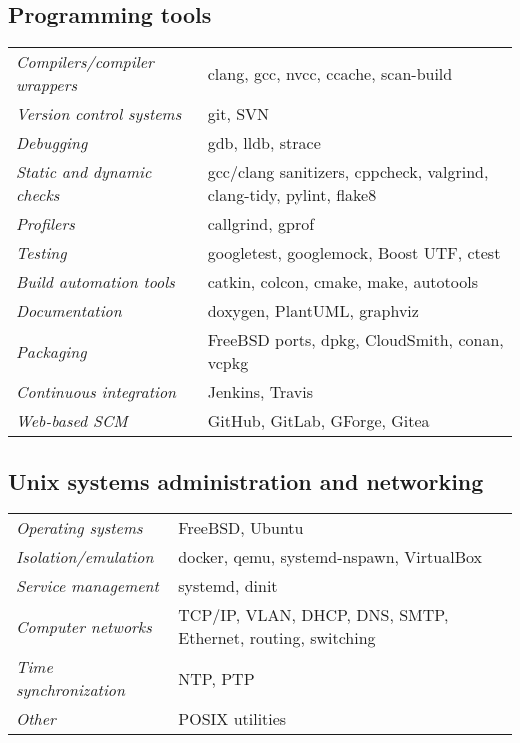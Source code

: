 \documentclass[a4paper,10pt]{report}
\begin{document}
\begin{adjustwidth}{0.5cm}{0pt}
\subsection{Programming tools}
\begin{adjustwidth}{0.5cm}{0pt}
    \begin{tabularx}{\linewidth}{l X}
        {\it Compilers/compiler wrappers}   & clang, gcc, nvcc, ccache, scan-build \\
        {\it Version control systems}       & git, SVN \\
        {\it Debugging}                     & gdb, lldb, strace \\
        {\it Static and dynamic checks}     & gcc/clang sanitizers, cppcheck, valgrind, clang-tidy, pylint, flake8 \\
        {\it Profilers}                     & callgrind, gprof \\
        {\it Testing}                       & googletest, googlemock, Boost UTF, ctest \\
        {\it Build automation tools}        & catkin, colcon, cmake, make, autotools \\
        {\it Documentation}                 & doxygen, PlantUML, graphviz \\
        {\it Packaging}                     & FreeBSD ports, dpkg, CloudSmith, conan, vcpkg \\
        {\it Continuous integration}        & Jenkins, Travis \\
        {\it Web-based SCM}                 & GitHub, GitLab, GForge, Gitea
    \end{tabularx}
\end{adjustwidth}

\subsection{Unix systems administration and networking}
\begin{adjustwidth}{0.5cm}{0pt}
    \begin{tabularx}{\linewidth}{l X}
        {\it Operating systems}             & FreeBSD, Ubuntu\\
        {\it Isolation/emulation}           & docker, qemu, systemd-nspawn, VirtualBox\\
        {\it Service management}            & systemd, dinit\\
        {\it Computer networks}             & TCP/IP, VLAN, DHCP, DNS, SMTP, Ethernet, routing, switching\\
        {\it Time synchronization}          & NTP, PTP\\
        {\it Other}                         & POSIX utilities
    \end{tabularx}
\end{adjustwidth}


\end{adjustwidth}
\end{document}
